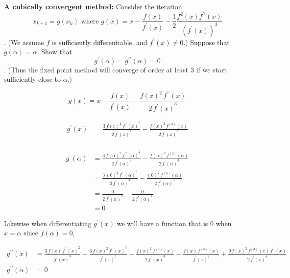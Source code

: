 \textbf{A cubically convergent method:} Consider the iteration \[x_{k+1} = g(x_k)\text{    where    }g(x) = x - \frac{f(x)}{f^\prime(x)} - \frac{1}{2} \frac{f^2 (x) f^{\prime \prime} (x)}{\left(f^\prime(x)\right)^3}\]. (We assume $f$ is sufficiently differentiable, and $f^\prime(x) \ne 0$.) Suppose that $g(\alpha) = \alpha$. Show that \[g^\prime(\alpha) = g^{\prime\prime}(\alpha) = 0\]. (Thus the fixed point method will converge of order at least 3 if we start sufficiently close to $\alpha$.)

{\color{blue}

\[
g(x) = x - \frac{f(x)}{f^\prime(x)} - \frac{{f(x)}^2\, f^{\prime \prime}(x)}{2\, { f^\prime(x)}^3}
\]

\[
\begin{aligned}
g^\prime (x)
&= \frac{3\, {f(x)}^2\, { f^{\prime \prime}(x)}^2}{2\, { f^\prime(x)}^4} - \frac{{f(x)}^2\, f^{(3)}(x)}{2\, { f^\prime(x)}^3} \\
\end{aligned}
\]

\[
\begin{aligned}
g^\prime (\alpha) &= \frac{3\, {f(\alpha)}^2\, { f^{\prime \prime}(\alpha)}^2}{2\, { f^\prime(\alpha)}^4} - \frac{{f(\alpha)}^2\, f^{(3)}(\alpha)}{2\, { f^\prime(\alpha)}^3} \\
&= \frac{3\, {(0)}^2\, { f^{\prime \prime}(\alpha)}^2}{2\, { f^\prime(\alpha)}^4} - \frac{{(0)}^2\, f^{(3)}(\alpha)}{2\, { f^\prime(\alpha)}^3} \\
&= \frac{0}{2\, { f^\prime(\alpha)}^4} - \frac{0}{2\, { f^\prime(\alpha)}^3} \\
&= 0
\end{aligned}
\]

Likewise when differentiating $g^\prime(x)$ we will have a function
that is $0$ when $x = \alpha$ since $f(\alpha) = 0$,

\[
\begin{aligned}
g^{\prime \prime} (x) &= \frac{3\, f(x)\, {f^{\prime \prime}(x)}^2}{{ f^\prime(x)}^3} -
\frac{6\, {f(x)}^2\, {f^{\prime \prime}(x)}^3}{{ f^\prime(x)}^5} -
\frac{{f(x)}^2\,  f^{(4)}(x)}{2\, { f^\prime(x)}^3} - \frac{f(x)\,
  f^{(3)}(x)}{{ f^\prime(x)}^2} + \frac{9\, {f(x)}^2\,  f^{(3)}(x)\,
   f^{\prime \prime}(x)}{2\, { f^\prime(x)}^4} \\
g^{\prime \prime} (\alpha) &= 0
\end{aligned}
\]

}
